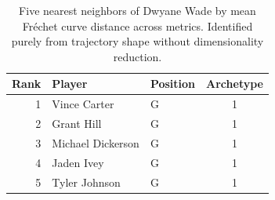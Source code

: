 \begin{table}[htbp]
  \centering\small
  \begin{tabular}{rllc}
    \toprule
    Rank & Player & Position & Archetype \\
    \midrule
    1 & Vince Carter & G & 1 \\
    2 & Grant Hill & G & 1 \\
    3 & Michael Dickerson & G & 1 \\
    4 & Jaden Ivey & G & 1 \\
    5 & Tyler Johnson & G & 1 \\
    \bottomrule
  \end{tabular}
  \caption{Five nearest neighbors of Dwyane Wade by mean Fr\'{e}chet curve distance across metrics. Identified purely from trajectory shape without dimensionality reduction.}
  \label{tab:Dwyane_Wade_frechet_curve_neighbors}
\end{table}

